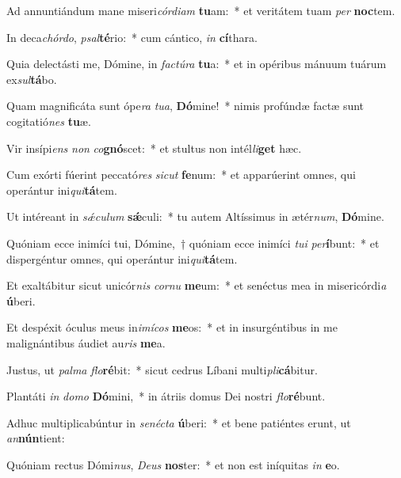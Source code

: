 \item Ad annuntiándum mane miseri\textit{cór}\textit{di}\textit{am} \textbf{tu}am:~* et veritátem tuam \textit{per} \textbf{noc}tem.
\item In deca\textit{chór}\textit{do}, \textit{psal}\textbf{té}rio:~* cum cántico, \textit{in} \textbf{cí}thara.
\item Quia delectásti me, Dómine, in \textit{fac}\textit{tú}\textit{ra} \textbf{tu}a:~* et in opéribus mánuum tuárum ex\textit{sul}\textbf{tá}bo.
\item Quam magnificáta sunt ópe\textit{ra} \textit{tu}\textit{a}, \textbf{Dó}mine!~* nimis profúndæ factæ sunt cogitatió\textit{nes} \textbf{tu}æ.
\item Vir insípi\textit{ens} \textit{non} \textit{co}\textbf{gnó}scet:~* et stultus non intél\textit{li}\textbf{get} hæc.
\item Cum exórti fúerint peccató\textit{res} \textit{sic}\textit{ut} \textbf{fe}num:~* et apparúerint omnes, qui operántur ini\textit{qui}\textbf{tá}tem.
\item Ut intéreant in \textit{sǽ}\textit{cu}\textit{lum} \textbf{sǽ}culi:~* tu autem Altíssimus in ætér\textit{num}, \textbf{Dó}mine.
\item Quóniam ecce inimíci tui, Dómine,~† quóniam ecce inimíci \textit{tu}\textit{i} \textit{per}\textbf{í}bunt:~* et dispergéntur omnes, qui operántur ini\textit{qui}\textbf{tá}tem.
\item Et exaltábitur sicut unicór\textit{nis} \textit{cor}\textit{nu} \textbf{me}um:~* et senéctus mea in misericórdi\textit{a} \textbf{ú}beri.
\item Et despéxit óculus meus in\textit{i}\textit{mí}\textit{cos} \textbf{me}os:~* et in insurgéntibus in me malignántibus áudiet au\textit{ris} \textbf{me}a.
\item Justus, ut \textit{pal}\textit{ma} \textit{flo}\textbf{ré}bit:~* sicut cedrus Líbani multi\textit{pli}\textbf{cá}bitur.
\item Plantáti \textit{in} \textit{do}\textit{mo} \textbf{Dó}mini,~* in átriis domus Dei nostri \textit{flo}\textbf{ré}bunt.
\item Adhuc multiplicabúntur in \textit{se}\textit{néc}\textit{ta} \textbf{ú}beri:~* et bene patiéntes erunt, ut \textit{an}\textbf{nún}tient:
\item Quóniam rectus Dómi\textit{nus}, \textit{De}\textit{us} \textbf{nos}ter:~* et non est iníquitas \textit{in} \textbf{e}o.
